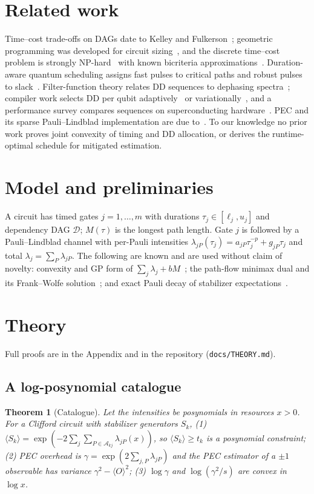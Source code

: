 \documentclass[10pt,journal]{IEEEtran}
\newtheorem{theorem}{Theorem}
\theoremstyle{remark}
\begin{document}
\section{Related work}
Time--cost trade-offs on DAGs date to Kelley and Fulkerson~\cite{kelley1961,fulkerson1961}; geometric programming
was developed for circuit sizing~\cite{boyd2005,boyd2007}, and the discrete time--cost problem is strongly
NP-hard~\cite{de1997} with known bicriteria approximations~\cite{skutella1998}. Duration-aware quantum
scheduling assigns fast pulses to critical paths and robust pulses to slack~\cite{lussi2025}. Filter-function
theory relates DD sequences to dephasing spectra~\cite{uhrig2007,cywinski2008,biercuk2011}; compiler work selects
DD per qubit adaptively~\cite{das2021} or variationally~\cite{ravi2022}, and a performance survey compares
sequences on superconducting hardware~\cite{ezzell2023}. PEC and its sparse Pauli--Lindblad implementation are
due to~\cite{temme2017,vandenberg2023}. To our knowledge no prior work proves joint convexity of timing and DD
allocation, or derives the runtime-optimal schedule for mitigated estimation.

\section{Model and preliminaries}\label{sec:model}
A circuit has timed gates $j=1,\dots,m$ with durations $\tau_j\in[\ell_j,u_j]$ and dependency DAG $\mathcal D$;
$M(\tau)$ is the longest path length. Gate $j$ is followed by a Pauli--Lindblad channel with per-Pauli
intensities $\lambda_{jP}(\tau_j)=a_{jP}\tau_j^{-p}+g_{jP}\tau_j$ and total $\lambda_j=\sum_P\lambda_{jP}$.
The following are known and are used without claim of novelty: convexity and GP form of
$\sum_j\lambda_j+bM$~\cite{boyd2005,boyd2007}; the path-flow minimax dual and its Frank--Wolfe
solution~\cite{kelley1961,fulkerson1961,jaggi2013}; and exact Pauli decay of stabilizer
expectations~\cite{vandenberg2023}.

\section{Theory}\label{sec:theory}
Full proofs are in the Appendix and in the repository (\texttt{docs/THEORY.md}).

\subsection{A log-posynomial catalogue}
\begin{theorem}[Catalogue]\label{thm:c1}
Let the intensities be posynomials in resources $x>0$. For a Clifford circuit with stabilizer generators $S_k$,
(1) $\langle S_k\rangle=\exp(-2\sum_j\sum_{P\in\mathcal A_{kj}}\lambda_{jP}(x))$, so $\langle S_k\rangle\ge t_k$
is a posynomial constraint; (2) PEC overhead is $\gamma=\exp(2\sum_{j,P}\lambda_{jP})$ and the PEC estimator
of a $\pm1$ observable has variance $\gamma^2-\langle O\rangle^2$; (3) $\log\gamma$ and $\log(\gamma^2/s)$
are convex in $\log x$.
\end{theorem}
\end{document}
